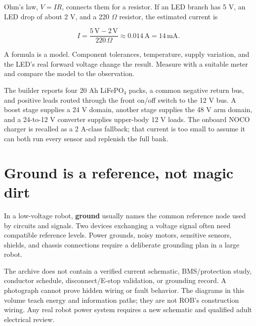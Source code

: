 \documentclass[11pt,openany]{book}
\begin{document}
Ohm's law, $V = I R$, connects them for a resistor. If an LED branch has 5 V, an LED drop of about 2 V, and a 220 $\Omega$ resistor, the estimated current is

\[
I = \frac{5\,\mathrm{V}-2\,\mathrm{V}}{220\,\Omega} \approx 0.014\,\mathrm{A} = 14\,\mathrm{mA}.
\]

\begin{conceptbox}
A formula is a model. Component tolerances, temperature, supply variation, and the LED's real forward voltage change the result. Measure with a suitable meter and compare the model to the observation.
\end{conceptbox}


The builder reports four 20 Ah LiFePO$_4$ packs, a common negative return bus, and positive leads routed through the front on/off switch to the 12 V bus. A boost stage supplies a 24 V domain, another stage supplies the 48 V arm domain, and a 24-to-12 V converter supplies upper-body 12 V loads. The onboard NOCO charger is recalled as a 2 A-class fallback; that current is too small to assume it can both run every sensor and replenish the full bank.

\ROBPowerArchitectureDiagram

\section*{Ground is a reference, not magic dirt}

In a low-voltage robot, \textbf{ground} usually names the common reference node used by circuits and signals. Two devices exchanging a voltage signal often need compatible reference levels. Power grounds, noisy motors, sensitive sensors, shields, and chassis connections require a deliberate grounding plan in a large robot.

\begin{safetybox}[title={WHY THIS BOOK HAS NO AS-BUILT POWER TREE}]
The archive does not contain a verified current schematic, BMS/protection study, conductor schedule, disconnect/E-stop validation, or grounding record. A photograph cannot prove hidden wiring or fault behavior. The diagrams in this volume teach energy and information paths; they are not ROB's construction wiring. Any real robot power system requires a new schematic and qualified adult electrical review.
\end{safetybox}
\end{document}
